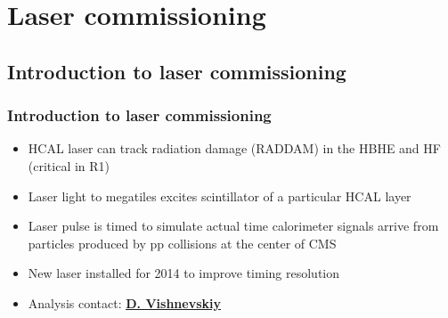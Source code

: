 \documentclass[bigger]{beamer}
\providecommand{\alert}[1]{\textbf{#1}}
\begin{document}
\section{Laser commissioning}
\label{sec-4}
\subsection{Introduction to laser commissioning}
\label{sec-4-1}
\begin{frame}
\frametitle{Introduction to laser commissioning}
\label{sec-4-1-1}
\begin{itemize}

\item HCAL laser can track radiation damage (RADDAM) in the HBHE and HF (critical in R1)
\label{sec-4-1-1-1}%

\item Laser light to megatiles excites scintillator of a particular HCAL layer
\label{sec-4-1-1-2}%

\item Laser pulse is timed to simulate actual time calorimeter signals arrive from particles produced by pp collisions at the center of CMS
\label{sec-4-1-1-3}%

\item New laser installed for 2014 to improve timing resolution
\label{sec-4-1-1-4}%

\item Analysis contact: \href{mailto:dmitry.vishnevskiy@cern.ch}{\underline{\alert{D. Vishnevskiy}}}
\label{sec-4-1-1-5}%
\end{itemize} %
\end{frame}
\end{document}
